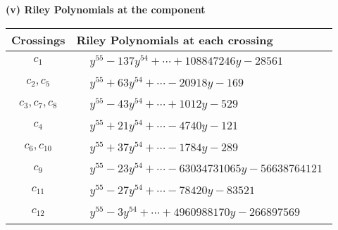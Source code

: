 \documentclass[1p]{elsarticle_modified}
\theoremstyle{definition}
\begin{document}
\newpage\renewcommand{\arraystretch}{1}
\flushleft \textbf{(v) Riley Polynomials at the component}\newline \\
\begin{tabular}{m{50pt}|m{274pt}}
Crossings & \hspace{64pt}Riley Polynomials at each crossing \\
\hline $$\begin{aligned}c_{1}\end{aligned}$$&$\begin{aligned}
&y^{55}-137 y^{54}+\cdots+108847246 y-28561
\end{aligned}$\\
\hline $$\begin{aligned}c_{2},c_{5}\end{aligned}$$&$\begin{aligned}
&y^{55}+63 y^{54}+\cdots-20918 y-169
\end{aligned}$\\
\hline $$\begin{aligned}c_{3},c_{7},c_{8}\end{aligned}$$&$\begin{aligned}
&y^{55}-43 y^{54}+\cdots+1012 y-529
\end{aligned}$\\
\hline $$\begin{aligned}c_{4}\end{aligned}$$&$\begin{aligned}
&y^{55}+21 y^{54}+\cdots-4740 y-121
\end{aligned}$\\
\hline $$\begin{aligned}c_{6},c_{10}\end{aligned}$$&$\begin{aligned}
&y^{55}+37 y^{54}+\cdots-1784 y-289
\end{aligned}$\\
\hline $$\begin{aligned}c_{9}\end{aligned}$$&$\begin{aligned}
&y^{55}-23 y^{54}+\cdots-63034731065 y-56638764121
\end{aligned}$\\
\hline $$\begin{aligned}c_{11}\end{aligned}$$&$\begin{aligned}
&y^{55}-27 y^{54}+\cdots-78420 y-83521
\end{aligned}$\\
\hline $$\begin{aligned}c_{12}\end{aligned}$$&$\begin{aligned}
&y^{55}-3 y^{54}+\cdots+4960988170 y-266897569
\end{aligned}$\\
\hline
\end{tabular}\\~\\
\end{document}
